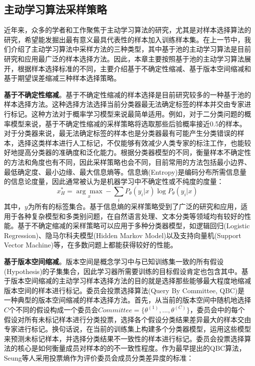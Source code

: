\subsection{主动学习算法采样策略}
近年来，众多的学者和工作聚焦于主动学习算法的研究，尤其是对样本选择算法的研究，希望能发掘出最有意义最具代表性的样本加入训练样本集。在上一节中，我们介绍了主动学习算法中采样方法的三种类型，其中基于池的主动学习算法是目前研究和应用最广泛的样本选择方法。因此，本章主要按照基于池的主动学习算法展开，根据样本选择标准的不同，主要介绍基于不确定性缩减、基于版本空间缩减和基于期望误差缩减三种样本选择策略。
\begin{asparaenum}
\item \textbf{基于不确定性缩减}。基于不确定性缩减的样本选择是目前研究较多的一种基于池的样本选择方法。这种选择方法选择当前分类器最无法确定标签的样本并交由专家进行标记。这种方法对于概率学习模型来说最简单适用。例如，对于二分类问题的概率模型来说，基于不确定性缩减的采样策略将选取那些后验概率接近0.5的样本\cite{lewis1994heterogeneous}。对于分类器来说，最无法确定标签的样本也是分类器最有可能产生分类错误的样本，选择这类样本进行人工标记，不仅能够有效减少人类专家的标注工作，也能较好地提高分类器的准确度和泛化能力。根据分类器模型的不同，衡量样本不确定性的方法和角度也有不同，因此采样策略也会不同，目前常用的方法包括最小边界、最低确定度、最小边缘、最大信息熵等。信息熵(Entropy)\cite{shannon1948math}是编码分布所需信息量的信息论度量，因此通常被认为是机器学习中不确定性或不纯度的度量：
\begin{equation}
x_{H}^{*}=\underset{x}{\arg\max}-\sum_{i}P_{\theta }(y_{i}|x)\log P_{\theta}(y_{i}|x)
\end{equation}
其中，$y$为所有的标签集合。基于信息熵的采样策略受到了广泛的研究和应用\cite{culotta2005reducing,hoi2006large}，适用于各种复杂模型和多类别问题，在自然语言处理、文本分类等领域均有较好的性能。基于不确定缩减的采样策略可以应用于多种分类器模型，如逻辑回归(Logistic Regression)、隐马尔科夫模型(Hidden Markov Model)以及支持向量机(Support Vector Machine)等，在多数问题上都能获得较好的性能。
\item \textbf{基于版本空间缩减}。版本空间是概念学习中与已知训练集一致的所有假设(Hypothesis)的子集集合，因此学习器所需要训练的目标假设肯定也包含其中。基于版本空间缩减的主动学习样本选择方法的目的就是选择那些能够最大程度地缩减版本空间的样本进行标记。委员会投票选择算法(Query By Committee, QBC)是一种典型的版本空间缩减的样本选择方法。首先，从当前的版本空间中随机地选择$C$个不同的假设构成一个委员会$Committee=\{\theta^{(1)},...,\theta^{(C)}\}$，委员会中的每个假设对所有未标记样本进行分类投票，选择各个假设分类结果差异最大的样本交由专家进行标记。换句话说，在当前的训练集上构建多个分类器模型，运用这些模型来预测未标记样本，并选择分类结果不一致性的样本进行标记。委员会投票选择算法的核心是如何衡量成员对样本的的不一致性程度。作为最早提出的QBC算法\cite{seung1992query}，Seung等人采用投票熵作为评价委员会成员分类差异度的标准：

\end{asparaenum}
